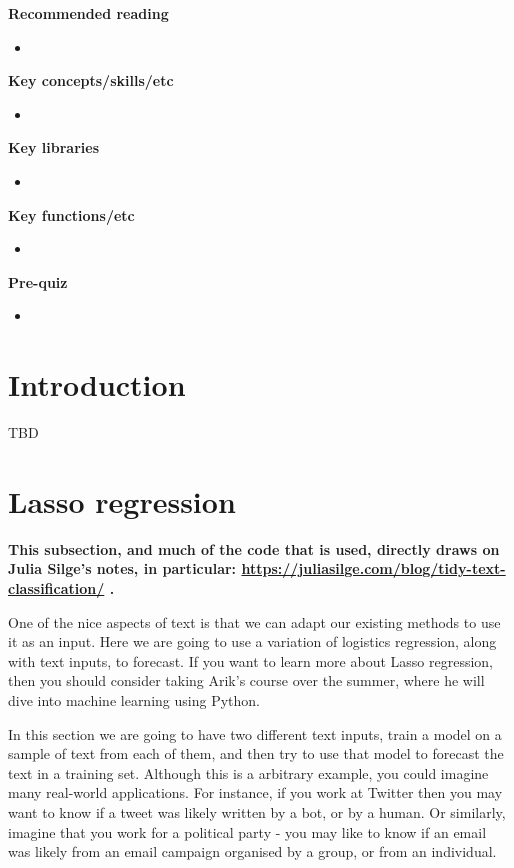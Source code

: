 \documentclass[
]{book}
\begin{document}
\textbf{Recommended reading}

\begin{itemize}
\item
\end{itemize}

\textbf{Key concepts/skills/etc}

\begin{itemize}
\item
\end{itemize}

\textbf{Key libraries}

\begin{itemize}
\item
\end{itemize}

\textbf{Key functions/etc}

\begin{itemize}
\item
\end{itemize}

\textbf{Pre-quiz}

\begin{itemize}
\item
\end{itemize}

\hypertarget{introduction-26}{%
\section{Introduction}\label{introduction-26}}

TBD

\hypertarget{lasso-regression}{%
\section{Lasso regression}\label{lasso-regression}}

\textbf{This subsection, and much of the code that is used, directly draws on Julia Silge's notes, in particular: \url{https://juliasilge.com/blog/tidy-text-classification/} \citep{silge2018}.}

One of the nice aspects of text is that we can adapt our existing methods to use it as an input. Here we are going to use a variation of logistics regression, along with text inputs, to forecast. If you want to learn more about Lasso regression, then you should consider taking Arik's course over the summer, where he will dive into machine learning using Python.

In this section we are going to have two different text inputs, train a model on a sample of text from each of them, and then try to use that model to forecast the text in a training set. Although this is a arbitrary example, you could imagine many real-world applications. For instance, if you work at Twitter then you may want to know if a tweet was likely written by a bot, or by a human. Or similarly, imagine that you work for a political party - you may like to know if an email was likely from an email campaign organised by a group, or from an individual.
\end{document}
